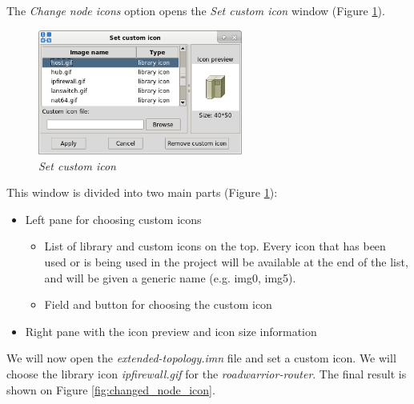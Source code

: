 The \emph{Change node icons} option opens the \emph{Set custom icon} window
(Figure \ref{fig:set_custom_icon}).

\begin{figure}[H]
	\centering
	\vspace{10pt}
	\includegraphics[width=0.6\textwidth]{./images/set_custom_icon.png}
	\caption{\emph{Set custom icon}}
	\label{fig:set_custom_icon}
\end{figure}

This window is divided into two main parts (Figure \ref{fig:set_custom_icon}):
\begin{itemize}
    \item Left pane for choosing custom icons
    \begin{itemize}
	\item List of library and custom icons on the top. Every icon that has
been used or is being used in the project will be available at the end of the
list, and will be given a generic name (e.g. img0, img5).
	\item Field and button for choosing the custom icon
    \end{itemize}
    \item Right pane with the icon preview and icon size information
\end{itemize}

We will now open the \emph{extended-topology.imn} file and set a custom icon.
We will choose the library icon \emph{ipfirewall.gif} for the
\emph{roadwarrior-router}. The final result is shown on Figure
\ref{fig:changed_node_icon}.

